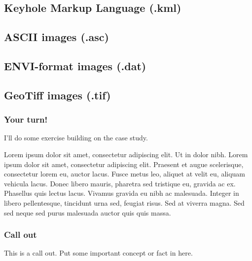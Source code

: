 \documentclass[
]{book}
\begin{document}
\hypertarget{keyhole-markup-language-.kml}{%
\subsection{Keyhole Markup Language (.kml)}\label{keyhole-markup-language-.kml}}

\hypertarget{ascii-images-.asc}{%
\subsection{ASCII images (.asc)}\label{ascii-images-.asc}}

\hypertarget{envi-format-images-.dat}{%
\subsection{ENVI-format images (.dat)}\label{envi-format-images-.dat}}

\hypertarget{geotiff-images-.tif}{%
\subsection{GeoTiff images (.tif)}\label{geotiff-images-.tif}}

\hypertarget{your-turn-2}{%
\subsubsection*{Your turn!}\label{your-turn-2}}

I'll do some exercise building on the case study.

Lorem ipsum dolor sit amet, consectetur adipiscing elit. Ut in dolor nibh. Lorem ipsum dolor sit amet, consectetur adipiscing elit. Praesent et augue scelerisque, consectetur lorem eu, auctor lacus. Fusce metus leo, aliquet at velit eu, aliquam vehicula lacus. Donec libero mauris, pharetra sed tristique eu, gravida ac ex. Phasellus quis lectus lacus. Vivamus gravida eu nibh ac malesuada. Integer in libero pellentesque, tincidunt urna sed, feugiat risus. Sed at viverra magna. Sed sed neque sed purus malesuada auctor quis quis massa.

\hypertarget{call-out-1}{%
\subsubsection*{Call out}\label{call-out-1}}

This is a call out. Put some important concept or fact in here.
\end{document}
